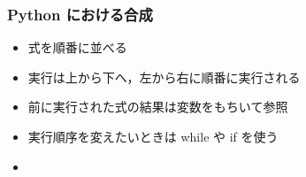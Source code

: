 \begin{frame}[label=composit]
\frametitle{Python における合成}
  \begin{itemize}
\item 式を順番に並べる
\item 実行は上から下へ，左から右に順番に実行される
\item 前に実行された式の結果は変数をもちいて参照
\item 実行順序を変えたいときは while や if を使う
\item \hyperlink{mult}{}
  \end{itemize}
\end{frame}
